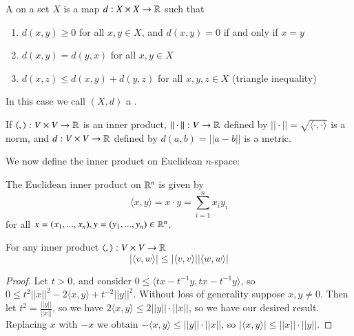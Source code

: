 \begin{definition}
    A  on a set $X$ is a map $d:X\times X\rightarrow \mathbb R$ such that \begin{enumerate}
        \item $d(x,y) \geq 0$ for all $x,y \in X$, and $d(x,y) = 0$ if and only if $x=y$
        \item $d(x,y) = d(y,x)$ for all $x,y \in X$
        \item $d(x,z) \leq d(x,y)+d(y,z)$ for all $x,y,z \in X$ (triangle inequality)
    \end{enumerate}
    In this case we call $(X,d)$ a .
\end{definition}

\begin{proposition}
    If $\langle ,\rangle:V\times V\rightarrow \mathbb R$ is an inner product, $||\cdot ||:V\rightarrow \mathbb R$ defined by $||\cdot || = \sqrt{\langle \cdot,\cdot\rangle}$ is a norm, and $d:V\times V\rightarrow \mathbb R$ defined by $d(a,b) = ||a-b||$ is a metric.
\end{proposition}

We now define the inner product on Euclidean $n$-space:

\begin{definition}
    The Euclidean inner product on $\mathbb R^n$ is given by \begin{equation*}
        \langle x,y\rangle = x\cdot y = \sum_{i=1}^nx_iy_i
    \end{equation*}
    for all $x = (x_1,...,x_n),y=(y_1,...,y_n) \in \mathbb R^n$.
\end{definition}

\begin{proposition}
    For any inner product $\langle ,\rangle:V\times V\rightarrow \mathbb R$\begin{equation*}
        |\langle v,w\rangle|\leq |\langle v,v\rangle||\langle w,w\rangle|
    \end{equation*}
\end{proposition}
\begin{proof}
    Let $t > 0$, and consider $0 \leq \langle tx-t^{-1}y,tx-t^{-1}y\rangle$, so $0 \leq t^2||x||^2-2\langle x,y\rangle + t^{-2}||y||^2$. Without loss of generality suppose $x,y \neq 0$. Then let $t^2 = \frac{||y||}{||x||}$, so we have $2\langle x,y\rangle \leq 2||y||\cdot||x||$, so we have our desired result. Replacing $x$ with $-x$ we obtain $-\langle x,y\rangle \leq ||y||\cdot||x||$, so $|\langle x,y\rangle| \leq ||x||\cdot ||y||$.
\end{proof}


